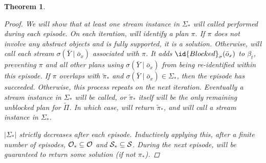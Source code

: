 \documentclass[letterpaper]{article} %
\theoremstyle{plain}\newtheorem{thm}{Theorem}
\theoremstyle{definition}\newtheorem{defn}{Definition}
\theoremstyle{plain}\newtheorem{lem}{Lemma}
\theoremstyle{plain}\newtheorem{cor}{Corollary}
\newcommand{\focused}{focused}
\begin{document}
\begin{thm}
\begin{proof}
We will show that at least one %
stream instance in $\Sigma_*$ will called performed during each episode.
On each iteration,  will identify a plan $\pi$. 
If $\pi$ does not involve any abstract objects and is fully supported, it is a solution. 
Otherwise,  will call each stream $\sigma(\bar{Y} \mid \bar{o}_x)$ associated with $\pi$. It adds $\id{Blocked}_\sigma(\bar{o}_x)$ to $\beta_t$, preventing $\pi$ and all other plans using $\sigma(\bar{Y} \mid \bar{o}_x)$ from being re-identified within this episode. 
If $\pi$ overlaps with $\tilde{\pi}_*$ and $\sigma(\bar{Y} \mid \bar{o}_x) \in \Sigma_*$, then the episode has succeeded.
Otherwise, this process repeats on the next iteration. 
Eventually a stream instance in $\Sigma_*$ will be called, or $\tilde{\pi}_*$ itself will be the only remaining unblocked plan for $\tilde{\Pi}$. In which case,  will return $\tilde{\pi}_*$, and  will call a stream instance in $\Sigma_*$.

$|\Sigma_*|$ strictly decreases after each episode. Inductively applying this, after a finite number of episodes, 
${\cal O}_* \subseteq {\cal O}$ and ${\cal S}_* \subseteq {\cal S}$. During the next episode,  will be guaranteed to return some solution (if not $\pi_*$).



\end{proof}
\end{thm}
\end{document}
